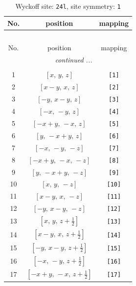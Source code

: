 \documentclass[fleqn,8pt]{jsarticle}
\begin{document}
\begin{longtable}{ccc}
\caption{Wyckoff site: {\tt 24l}, site symmetry: {\tt 1}}
 \\
 \hline \hline
No. & position & mapping \\ \hline \endfirsthead

\multicolumn{2}{l}{\tablename\ \thetable{}} \\
 \hline \hline
No. & position & mapping \\ \hline \endhead

 \hline \hline
\multicolumn{2}{r}{\footnotesize\it continued ...} \\ \endfoot

 \hline \hline
\multicolumn{2}{r}{} \\ \endlastfoot

1 & $\left[ x,\, y,\, z \right]$ & {\tt [1]} \\ \hline
2 & $\left[ x - y,\, x,\, z \right]$ & {\tt [2]} \\ \hline
3 & $\left[ - y,\, x - y,\, z \right]$ & {\tt [3]} \\ \hline
4 & $\left[ - x,\, - y,\, z \right]$ & {\tt [4]} \\ \hline
5 & $\left[ - x + y,\, - x,\, z \right]$ & {\tt [5]} \\ \hline
6 & $\left[ y,\, - x + y,\, z \right]$ & {\tt [6]} \\ \hline
7 & $\left[ - x,\, - y,\, - z \right]$ & {\tt [7]} \\ \hline
8 & $\left[ - x + y,\, - x,\, - z \right]$ & {\tt [8]} \\ \hline
9 & $\left[ y,\, - x + y,\, - z \right]$ & {\tt [9]} \\ \hline
10 & $\left[ x,\, y,\, - z \right]$ & {\tt [10]} \\ \hline
11 & $\left[ x - y,\, x,\, - z \right]$ & {\tt [11]} \\ \hline
12 & $\left[ - y,\, x - y,\, - z \right]$ & {\tt [12]} \\ \hline
13 & $\left[ x,\, y,\, z + \frac{1}{2} \right]$ & {\tt [13]} \\ \hline
14 & $\left[ x - y,\, x,\, z + \frac{1}{2} \right]$ & {\tt [14]} \\ \hline
15 & $\left[ - y,\, x - y,\, z + \frac{1}{2} \right]$ & {\tt [15]} \\ \hline
16 & $\left[ - x,\, - y,\, z + \frac{1}{2} \right]$ & {\tt [16]} \\ \hline
17 & $\left[ - x + y,\, - x,\, z + \frac{1}{2} \right]$ & {\tt [17]} \\ \hline

\end{longtable}
\end{document}
